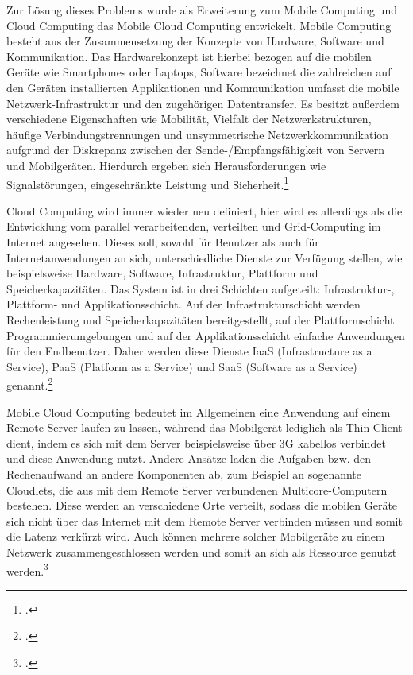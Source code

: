 Zur Lösung dieses Problems wurde als Erweiterung zum Mobile Computing und Cloud Computing das Mobile Cloud Computing entwickelt. Mobile Computing besteht aus der Zusammensetzung der Konzepte von Hardware, Software und Kommunikation. Das Hardwarekonzept ist hierbei bezogen auf die mobilen Geräte wie Smartphones oder Laptops, Software bezeichnet die zahlreichen auf den Geräten installierten Applikationen und Kommunikation umfasst die mobile Netzwerk-Infrastruktur und den zugehörigen Datentransfer. Es besitzt außerdem verschiedene Eigenschaften wie Mobilität, Vielfalt der Netzwerkstrukturen, häufige Verbindungstrennungen und unsymmetrische Netzwerkkommunikation aufgrund der Diskrepanz zwischen der Sende-/Empfangsfähigkeit von Servern und Mobilgeräten. Hierdurch ergeben sich Herausforderungen wie Signalstörungen, eingeschränkte Leistung und Sicherheit.\footcite[Vgl.][Seite 25]{MCC2}

Cloud Computing wird immer wieder neu definiert, hier wird es allerdings als die Entwicklung vom parallel verarbeitenden, verteilten und Grid-Computing im Internet angesehen. Dieses soll, sowohl für Benutzer als auch für Internetanwendungen an sich, unterschiedliche Dienste zur Verfügung stellen, wie beispielsweise Hardware, Software, Infrastruktur, Plattform und Speicherkapazitäten. Das System ist in drei Schichten aufgeteilt: Infrastruktur-, Plattform- und Applikationsschicht. Auf der Infrastrukturschicht werden Rechenleistung und Speicherkapazitäten bereitgestellt, auf der Plattformschicht Programmierumgebungen und auf der Applikationsschicht einfache Anwendungen für den Endbenutzer. Daher werden diese Dienste IaaS (Infrastructure as a Service), PaaS (Platform as a Service) und SaaS (Software as a Service) genannt.\footcite[Vgl.][Seite 26]{MCC2}

Mobile Cloud Computing bedeutet im Allgemeinen eine Anwendung auf einem Remote Server laufen zu lassen, während das Mobilgerät lediglich als Thin Client dient, indem es sich mit dem Server beispielsweise über 3G kabellos verbindet und diese Anwendung nutzt. Andere Ansätze laden die Aufgaben bzw. den Rechenaufwand an andere Komponenten ab, zum Beispiel an sogenannte Cloudlets, die aus mit dem Remote Server verbundenen Multicore-Computern bestehen. Diese werden an verschiedene Orte verteilt, sodass die mobilen Geräte sich nicht über das Internet mit dem Remote Server verbinden müssen und somit die Latenz verkürzt wird. Auch können mehrere solcher Mobilgeräte zu einem Netzwerk zusammengeschlossen werden und somit an sich als Ressource genutzt werden.\footcite[Vgl.][Seite 87]{MCC}

